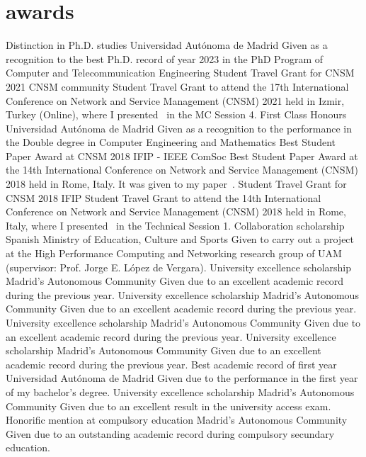 \documentclass[]{friggeri-cv}
\begin{document}
\section{awards}
\hspace{-5em}\vspace{-2.5em}
\begin{entrylist}
{Distinction in Ph.D. studies}
{Universidad Autónoma de Madrid}
{Given as a recognition to the best Ph.D. record of year 2023 in the PhD Program of Computer and Telecommunication Engineering}
{Student Travel Grant for CNSM 2021}
{CNSM community}
{Student Travel Grant to attend the 17th International Conference on Network and Service Management (CNSM) 2021 held in Izmir, Turkey (Online), where I presented~\cite{cnsm2021} in the MC Session 4.}
{First Class Honours}
{Universidad Autónoma de Madrid}
{Given as a recognition to the performance in the Double degree in Computer Engineering and Mathematics}
{Best Student Paper Award at CNSM 2018}
{IFIP - IEEE ComSoc}
{Best Student Paper Award at the 14th International Conference on Network and Service Management (CNSM) 2018 held in Rome, Italy. It was given to my paper~\cite{cnsm2018}.}
{Student Travel Grant for CNSM 2018}
{IFIP}
{Student Travel Grant to attend the 14th International Conference on Network and Service Management (CNSM) 2018 held in Rome, Italy, where I presented~\cite{cnsm2018} in the Technical Session 1.}
{Collaboration scholarship}
{Spanish Ministry of Education, Culture and Sports}
{Given to carry out a project at the High Performance Computing and Networking research group of UAM (supervisor:  Prof. Jorge E. López de Vergara).}
{University excellence scholarship}
{Madrid's Autonomous Community }
{Given due to an excellent academic record during the previous year.}
{University excellence scholarship}
{Madrid's Autonomous Community }
{Given due to an excellent academic record during the previous year.}
{University excellence scholarship}
{Madrid's Autonomous Community }
{Given due to an excellent academic record during the previous year.}
{University excellence scholarship}
{Madrid's Autonomous Community }
{Given due to an excellent academic record during the previous year.}
{Best academic record of first year}
{Universidad Autónoma de Madrid }
{Given due to the performance in the first year of my bachelor's degree.}
{University excellence scholarship}
{Madrid's Autonomous Community }
{Given due to an excellent result in the university access exam.}
{Honorific mention at compulsory education}
{Madrid's Autonomous Community }
{Given due to an outstanding academic record during compulsory secundary education.}
\end{entrylist}
\end{document}
